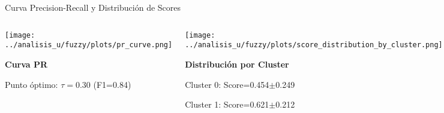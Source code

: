 \documentclass[aspectratio=169]{beamer}
\begin{document}

\begin{frame}{Curva Precision-Recall y Distribución de Scores}

\begin{columns}[T]
\begin{center}
\texttt{[image: ../analisis\_u/fuzzy/plots/pr\_curve.png]}

\textbf{Curva PR}

Punto óptimo: $\tau=0.30$ (F1=0.84)
\end{center}

\begin{center}
\texttt{[image: ../analisis\_u/fuzzy/plots/score\_distribution\_by\_cluster.png]}

\textbf{Distribución por Cluster}

Cluster 0: Score=0.454$\pm$0.249

Cluster 1: Score=0.621$\pm$0.212
\end{center}
\end{columns}

\end{frame}

\end{document}
